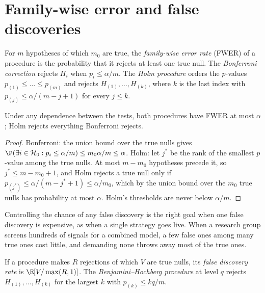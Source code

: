 \section{Family-wise error and false discoveries}

\begin{definition}\label{def:qm:testing-and-multiple-testing:fwer}
For $m$ hypotheses of which $m_0$ are true, the \emph{family-wise error rate} (FWER) of a procedure is
the probability that it rejects at least one true null. The \emph{Bonferroni correction} rejects
$H_i$ when $p_i \le \alpha/m$. The \emph{Holm procedure} orders the $p$-values $p_{(1)} \le \dots \le p_{(m)}$ and
rejects $H_{(1)}, \dots, H_{(k)}$, where $k$ is the last index with $p_{(j)} \le \alpha/(m - j + 1)$ for every $j \le k$.
\end{definition}

\begin{proposition}\label{prop:qm:testing-and-multiple-testing:fwer}
Under any dependence between the tests, both procedures have FWER at most $\alpha$; Holm rejects everything Bonferroni rejects.
\end{proposition}

\begin{proof}
Bonferroni: the union bound over the true nulls gives $\P(\exists i \in \mathcal H_0: p_i \le \alpha/m) \le m_0\alpha/m \le \alpha$.
Holm: let $j^*$ be the rank of the smallest $p$-value among the true nulls. At most $m - m_0$ hypotheses precede it, so $j^* \le
m - m_0 + 1$, and Holm rejects a true null only if $p_{(j^*)} \le \alpha/(m - j^* + 1) \le \alpha/m_0$, which by the union bound over
the $m_0$ true nulls has probability at most $\alpha$. Holm's thresholds are never below $\alpha/m$.
\end{proof}

Controlling the chance of any false discovery is the right goal when one false discovery is expensive, as when a single strategy
goes live. When a research group screens hundreds of signals for a combined model, a few false ones among many true ones cost
little, and demanding none throws away most of the true ones.

\begin{definition}\label{def:qm:testing-and-multiple-testing:fdr}
If a procedure makes $R$ rejections of which $V$ are true nulls, its \emph{false discovery rate} is
$\E[V/\max(R, 1)]$. The \emph{Benjamini--Hochberg procedure} at level $q$ rejects $H_{(1)},
\dots, H_{(k)}$ for the largest $k$ with $p_{(k)} \le kq/m$.
\end{definition}


